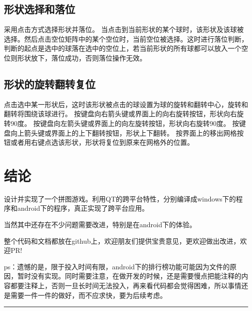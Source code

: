 \documentclass[11pt,twoside]{article} %
\begin{document}
\subsection{形状选择和落位}
采用点击方式选择形状并落位。
当点击到当前形状的某个球时，该形状及该球被选择。然后点击空位矩阵中的某个空位时，当前空位被选择。这时进行落位判断，判断的起点是选中的球落在选中的空位上，若当前形状的所有球都可以放入一个空位则形状放下，落位成功，否则落位操作无效。

\subsection{形状的旋转翻转复位}
点击选中某一形状后，这时该形状被点击的球设置为球的旋转和翻转中心，旋转和翻转将围绕该球进行。
按键盘向右箭头键或界面上的向右旋转按钮，形状向右旋转90度。
按键盘向左箭头键或界面上的向左旋转按钮，形状向右旋转90度。
按键盘向上箭头键或界面上的上下翻转按钮，形状上下翻转。
按界面上的移出网格按钮或者用右键点选该形状，形状将复位到原来在网格外的位置。




%
%
\section{结论}
设计并实现了一个拼图游戏。利用QT的跨平台特性，分别编译成windows下的程序和android下的程序，真正实现了跨平台应用。

当然其中还存在不少问题需要改进，特别是在android下的体验。

整个代码和文档都放在github上，欢迎朋友们提供宝贵意见，更欢迎做出改进，欢迎PR!

ps：遗憾的是，限于投入时间有限，android下的排行榜功能可能因为文件的原因，暂时没有实现。同时需要注意，在做开发的时候，还是需要慢点把能注释的内容都要注释上，否则一旦长时间无法投入，再来看代码都会觉得困难，所以事情还是需要一件一件的做好，而不应求快，要为后续考虑。




%


\vspace{1cm}
\noindent\rule{\linewidth}{3pt}
{}
\tableofcontents
{}
\listoffigures
{}
{}
\listofegcode
\end{document}
